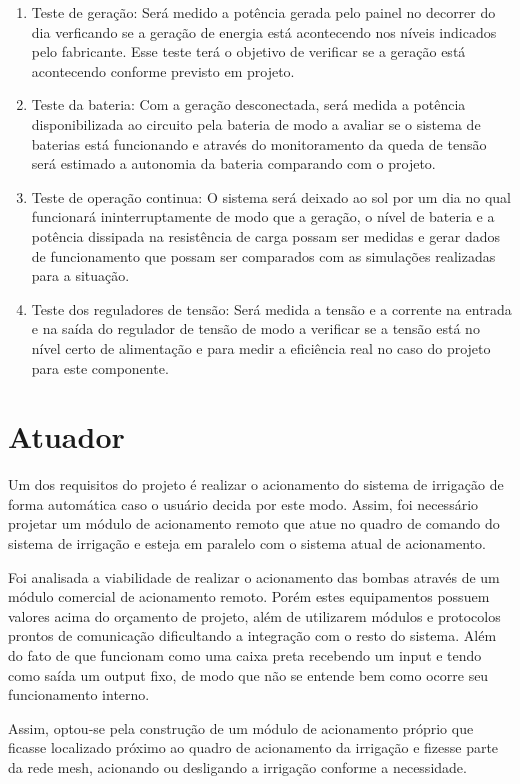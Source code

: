  \begin{enumerate}
   \item Teste de geração: Será medido a potência gerada pelo painel no decorrer do dia verficando se a geração de energia está acontecendo nos níveis indicados pelo fabricante. Esse teste terá o objetivo de verificar se a geração está acontecendo conforme previsto em projeto.
   \item Teste da bateria: Com a geração desconectada, será medida a potência disponibilizada ao circuito pela bateria de modo a avaliar se o sistema de baterias está funcionando e através do monitoramento da queda de tensão será estimado a autonomia da bateria comparando com o projeto.
   \item Teste de operação continua: O sistema será deixado ao sol por um dia no qual funcionará ininterruptamente de modo que a geração, o nível de bateria e a potência dissipada na resistência de carga possam ser medidas e gerar dados de funcionamento que possam ser comparados com as simulações realizadas para a situação.
   \item Teste dos reguladores de tensão: Será medida a tensão e a corrente na entrada e na saída do regulador de tensão de modo a verificar se a tensão está no nível certo de alimentação e para medir a eficiência real no caso do projeto para este componente.
 \end{enumerate}

\section{Atuador}

Um dos requisitos do projeto é realizar o acionamento do sistema de irrigação de forma automática caso o usuário decida por este modo. Assim, foi necessário projetar um módulo de acionamento remoto que atue no quadro de comando do sistema de irrigação e esteja em paralelo com o sistema atual de acionamento. 

Foi analisada a viabilidade de realizar o acionamento das bombas através de um módulo comercial de acionamento remoto. Porém estes equipamentos possuem valores acima do orçamento de projeto, além de utilizarem módulos e protocolos prontos de comunicação dificultando a integração com o resto do sistema. Além do fato de que funcionam como uma caixa preta recebendo um input e tendo como saída um output fixo, de modo que não se entende bem como ocorre seu funcionamento interno.

Assim, optou-se pela construção de um módulo de acionamento próprio que ficasse localizado próximo ao quadro de acionamento da irrigação e fizesse parte da rede mesh, acionando ou desligando a irrigação conforme a necessidade.

